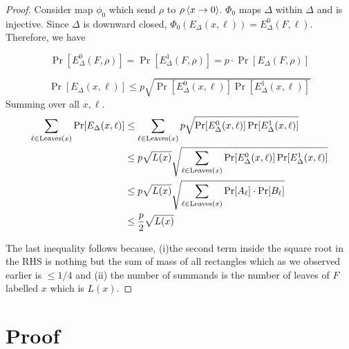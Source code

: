 \documentclass[11pt]{article}
\begin{document}
\begin{proof}
    Consider map $\phi_0$ which send $\rho$ to $\rho\left\langle x \to 0\right\rangle$. $\Phi_0$ maps $\Delta$ within $\Delta$ and is injective.
    Since $\Delta$ is downward closed, $\Phi_0(E_\Delta(x,\ell)) = E^0_\Delta(F,\ell)$. Therefore, we have 

    $$\Pr[E^0_\Delta(F,\rho)] = \Pr[E^1_\Delta(F,\rho)]= p \cdot \Pr[E_\Delta(F,\rho)]$$

    $$\Pr[E_\Delta(x,\ell)] \le p \sqrt{\Pr[E^0_\Delta(x,\ell)] \Pr[E^1_\Delta(x,\ell)]}$$
    Summing over all $x,\ell$.
    \begin{align*}
        \sum_{\ell \in \operatorname{Leaves}(x)} \Pr[E_\Delta(x,\ell)] 
        &\le \sum_{\ell \in \operatorname{Leaves}(x)}p \sqrt{\Pr[E^0_\Delta(x,\ell)] \Pr[E^1_\Delta(x,\ell)]}\\
        &\le p \sqrt{L(x)} \sqrt{\sum_{\ell \in \operatorname{Leaves}(x)} \Pr[E^0_\Delta(x,\ell)] \Pr[E^1_\Delta(x,\ell)]} \\
        &\le p\sqrt{{L(x)}} \sqrt{\sum_{\ell \in \operatorname{Leaves}(x)}\Pr[A_\ell]\cdot \Pr[B_\ell]}\\
        &\le \frac{p}2\sqrt{L(x)}        
    \end{align*}


    The last inequality follows because, (i)the second term inside the square root in the RHS is nothing but the sum of mass of all rectangles which as we observed earlier is $\le 1/4$ and (ii) the number of summands is the number of leaves of $F$ labelled $x$ which is $L(x)$. 
\end{proof}





\section{Proof}
\end{document}
